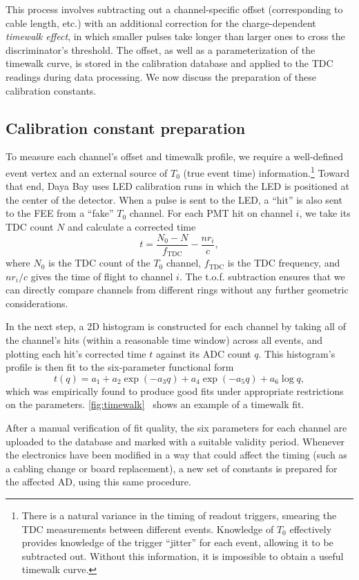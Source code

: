 \documentclass[../thesis.tex]{subfiles}
\begin{document}
This process involves subtracting out a channel-specific offset (corresponding
to cable length, etc.) with an additional correction for the charge-dependent
\emph{timewalk effect}, in which smaller pulses take longer than larger ones to
cross the discriminator's threshold. The offset, as well as a parameterization
of the timewalk curve, is stored in the calibration database and applied to the
TDC readings during data processing. We now discuss the preparation of these
calibration constants.

\subsection{Calibration constant preparation}

To measure each channel's offset and timewalk profile, we require a well-defined
event vertex and an external source of $T_0$ (true event time)
information.\footnote{There is a natural variance in the timing of readout
  triggers, smearing the TDC measurements between different events. Knowledge of
  $T_0$ effectively provides knowledge of the trigger ``jitter'' for each event,
  allowing it to be subtracted out. Without this information, it is impossible
  to obtain a useful timewalk curve.} Toward that end, Daya Bay uses LED
calibration runs in which the LED is positioned at the center of the
detector. When a pulse is sent to the LED, a ``hit'' is also sent to the FEE
from a ``fake'' $T_0$ channel. For each PMT hit on channel $i$, we take its TDC
count $N$ and calculate a corrected time
\[ t = \frac{N_0 - N}{f_\mathrm{TDC}} - \frac{n r_i}{c}, \] where $N_0$ is the
TDC count of the $T_0$ channel, $f_\mathrm{TDC}$ is the TDC frequency, and
$nr_i/c$ gives the time of flight to channel $i$. The t.o.f. subtraction ensures
that we can directly compare channels from different rings without any further
geometric considerations.

In the next step, a 2D histogram is constructed for each channel by taking all
of the channel's hits (within a reasonable time window) across all events, and
plotting each hit's corrected time $t$ against its ADC count $q$. This
histogram's profile is then fit to the six-parameter functional form
\[ t(q) = a_1 + a_2 \exp (-a_3 q) + a_4 \exp (-a_5 q) + a_6 \log q, \] which was
empirically found to produce good fits under appropriate restrictions on the
parameters. \autoref{fig:timewalk}~ shows an example of a timewalk fit.

After a manual verification of fit quality, the six parameters for each channel
are uploaded to the database and marked with a suitable validity
period. Whenever the electronics have been modified in a way that could affect
the timing (such as a cabling change or board replacement), a new set of
constants is prepared for the affected AD, using this same procedure.
\end{document}

